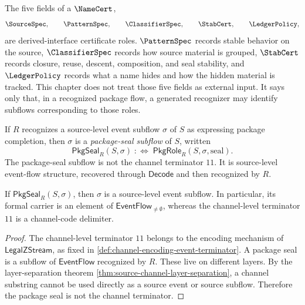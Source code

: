 \begin{remark}
\label{rem:package-generated-relation-to-namecert-fields}
The five fields of a $\NameCert$,
$$
  \SourceSpec,\qquad
  \PatternSpec,\qquad
  \ClassifierSpec,\qquad
  \StabCert,\qquad
  \LedgerPolicy,
$$
are derived-interface certificate roles. $\PatternSpec$ records stable behavior on the source, $\ClassifierSpec$ records how source material is grouped, $\StabCert$ records closure, reuse, descent, composition, and seal stability, and $\LedgerPolicy$ records what a name hides and how the hidden material is tracked. This chapter does not treat those five fields as external input. It says only that, in a recognized package flow, a generated recognizer may identify subflows corresponding to those roles.
\end{remark}

\begin{definition}
\label{def:package-generated-seal-subflow}
If $R$ recognizes a source-level event subflow $\sigma$ of $S$ as expressing package completion, then $\sigma$ is a \emph{package-seal subflow} of $S$, written
$$
  \mathsf{PkgSeal}_{R}(S,\sigma)
  \;:\Longleftrightarrow\;
  \mathsf{PkgRole}_{R}(S,\sigma,\mathrm{seal}).
$$
The package-seal subflow is not the channel terminator $11$. It is source-level event-flow structure, recovered through $\mathsf{Decode}$ and then recognized by $R$.
\end{definition}

\begin{proposition}
\label{prop:package-generated-seal-not-channel-terminator}
If $\mathsf{PkgSeal}_{R}(S,\sigma)$, then $\sigma$ is a source-level event subflow. In particular, its formal carrier is an element of $\mathsf{EventFlow}_{\ne\emptyset}$, whereas the channel-level terminator $11$ is a channel-code delimiter.
\end{proposition}

\begin{proof}
The channel-level terminator $11$ belongs to the encoding mechanism of $\mathsf{LegalZStream}$, as fixed in \autoref{def:channel-encoding-event-terminator}. A package seal is a subflow of $\mathsf{EventFlow}$ recognized by $R$. These live on different layers. By the layer-separation theorem \autoref{thm:source-channel-layer-separation}, a channel substring cannot be used directly as a source event or source subflow. Therefore the package seal is not the channel terminator.
\end{proof}

